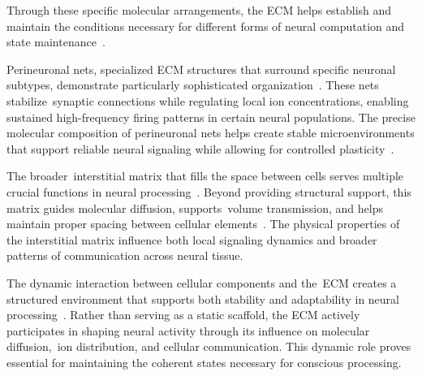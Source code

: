 Through these specific molecular arrangements, the ECM helps establish and maintain the conditions necessary for different forms of neural computation and state maintenance~\cite{Zimmermann2008, Dityatev2003}.

Perineuronal nets, specialized ECM structures that surround specific neuronal subtypes, demonstrate particularly sophisticated organization~\cite{Wang2012, Kwok2011}. These nets stabilize~synaptic connections while regulating local ion concentrations, enabling sustained high-frequency firing patterns in certain neural populations. The precise molecular composition of perineuronal nets helps create stable microenvironments that support reliable neural signaling while allowing for controlled plasticity~\cite{Kwok2011, Ferrer-Ferrer2018}.

The broader~interstitial matrix that fills the space between cells serves multiple crucial functions in neural processing~\cite{Ruoslahti1996, Nicholson1998}. Beyond providing structural support, this matrix guides molecular diffusion, supports~volume transmission, and helps maintain proper spacing between cellular elements~\cite{Nicholson1998, Hrabetova2009}. The physical properties of the interstitial matrix influence both local signaling dynamics and broader patterns of communication across neural tissue.

The dynamic interaction between cellular components and the~ECM creates a structured environment that supports both stability and adaptability in neural processing~\cite{Dityatev2003, Frischknecht2012}. Rather than serving as a static scaffold, the ECM actively participates in shaping neural activity through its influence on molecular diffusion,~ion distribution, and cellular communication. This dynamic role proves essential for maintaining the coherent states necessary for conscious processing.

